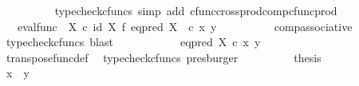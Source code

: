 \begin{isabellebody}
\ \ \ \ \ \ \ \ \isamarkupfalse%
\ {\isacharparenleft}{\kern0pt}typecheck{\isacharunderscore}{\kern0pt}cfuncs{\isacharcomma}{\kern0pt}\ simp\ add{\isacharcolon}{\kern0pt}\ cfunc{\isacharunderscore}{\kern0pt}cross{\isacharunderscore}{\kern0pt}prod{\isacharunderscore}{\kern0pt}comp{\isacharunderscore}{\kern0pt}cfunc{\isacharunderscore}{\kern0pt}prod{\isacharparenright}{\kern0pt}\isanewline
\ \ \ \ \ \ \isamarkupfalse%
\ \isamarkupfalse%
\ {\isachardoublequoteopen}{\isachardot}{\kern0pt}{\isachardot}{\kern0pt}{\isachardot}{\kern0pt}\ {\isacharequal}{\kern0pt}\ {\isacharparenleft}{\kern0pt}{\isacharparenleft}{\kern0pt}eval{\isacharunderscore}{\kern0pt}func\ {\isasymOmega}\ X{\isacharparenright}{\kern0pt}\ {\isasymcirc}\isactrlsub c\ {\isacharparenleft}{\kern0pt}id\ X\ {\isasymtimes}\isactrlsub f\ {\isacharparenleft}{\kern0pt}eq{\isacharunderscore}{\kern0pt}pred\ X\isactrlsup {\isasymsharp}{\isacharparenright}{\kern0pt}{\isacharparenright}{\kern0pt}\ {\isacharparenright}{\kern0pt}\ {\isasymcirc}\isactrlsub c\ {\isasymlangle}x{\isacharcomma}{\kern0pt}\ y{\isasymrangle}{\isachardoublequoteclose}\isanewline
\ \ \ \ \ \ \ \ \isamarkupfalse%
\ comp{\isacharunderscore}{\kern0pt}associative{}\ \isamarkupfalse%
\ {\isacharparenleft}{\kern0pt}typecheck{\isacharunderscore}{\kern0pt}cfuncs{\isacharcomma}{\kern0pt}\ blast{\isacharparenright}{\kern0pt}\isanewline
\ \ \ \ \ \ \isamarkupfalse%
\ \isamarkupfalse%
\ {\isachardoublequoteopen}{\isachardot}{\kern0pt}{\isachardot}{\kern0pt}{\isachardot}{\kern0pt}\ {\isacharequal}{\kern0pt}\ eq{\isacharunderscore}{\kern0pt}pred\ X\ {\isasymcirc}\isactrlsub c\ {\isasymlangle}x{\isacharcomma}{\kern0pt}\ y{\isasymrangle}{\isachardoublequoteclose}\isanewline
\ \ \ \ \ \ \ \ \isamarkupfalse%
\ transpose{\isacharunderscore}{\kern0pt}func{\isacharunderscore}{\kern0pt}def\ \isamarkupfalse%
\ {\isacharparenleft}{\kern0pt}typecheck{\isacharunderscore}{\kern0pt}cfuncs{\isacharcomma}{\kern0pt}\ presburger{\isacharparenright}{\kern0pt}\isanewline
\ \ \ \ \ \ \isamarkupfalse%
\ \isamarkupfalse%
\ {\isacharquery}{\kern0pt}thesis\isacommand{{\isachardot}{\kern0pt}}\isamarkupfalse%
\isanewline
\ \ \ \ \isamarkupfalse%
\isanewline
\ \ \ \ \isamarkupfalse%
\ \isamarkupfalse%
\ {\isachardoublequoteopen}x\ {\isacharequal}{\kern0pt}\ y{\isachardoublequoteclose}\isanewline
\ \ \ \ \ \ \isamarkupfalse%

\end{isabellebody}
